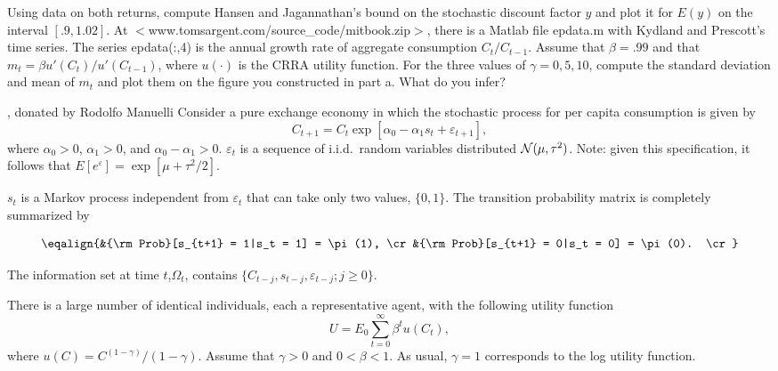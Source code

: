 \medskip


   Using data on both returns,  compute Hansen and Jagannathan's bound
 on the stochastic discount  factor $y$ and plot it
for $E(y)$ on the interval $[.9,1.02]$.
\medskip
{} At
$<$www.tomsargent.com/source\_code/mitbook.zip$>$,
%
 there is
a Matlab file epdata.m with Kydland and Prescott's  time series.
The series epdata(:,4) is the annual growth
rate of aggregate consumption $C_t / C_{t-1}$.
Assume that $\beta=.99$ and that $m_t = \beta u'(C_t)/ u'(C_{t-1})$,
where $u(\cdot)$ is the CRRA utility function.
   For the three values of $\gamma = 0, 5, 10$, compute
the standard deviation and mean of $m_t$ and plot
them on the  figure  you constructed in part a.  What do you
infer?

\medskip
{}
,
donated by Rodolfo Manuelli
\medskip\noindent
Consider a pure exchange economy in which  the stochastic process for per capita  consumption is given by
$$ C_{t+1} = C_t \exp[\alpha_0 - \alpha_1 s_t + \varepsilon_{t+1}],
 $$
where
\medskip
{}  $\alpha_0>0$, $\alpha_1>0$, and $\alpha_0-\alpha_1>0$.
\medskip
{}  ${\varepsilon_t}$ is a sequence of i.i.d.\ random variables
distributed ${\cal N}(\mu, \tau^2)$.  Note: given this specification, it
follows that $E[e^\varepsilon] = \exp[\mu + \tau^2/2]$.
\medskip

  ${s_t}$ is a Markov process independent from
${\varepsilon_t}$ that can take only two values, $\{0,1\}$.  The
transition probability matrix is completely summarized by

$$\eqalign{&{\rm Prob}[s_{t+1} = 1|s_t = 1] = \pi(1),  \cr
           &{\rm Prob}[s_{t+1} = 0|s_t = 0] = \pi(0).  \cr} $$

  The information set at time $t$,$\Omega_t$,
 contains $\{C_{t-j}, s_{t-j}, \varepsilon_{t-j}; j \geq 0\}$.
\medskip

There is a large number of identical individuals, each a representative agent, with the following utility function
$$ U = E_0{\sum_{t=0}^\infty \beta^t u(C_t)}, $$
where $u(C) = C^{(1-\gamma)}/(1-\gamma)$.  Assume that $\gamma>0$
and $0<\beta<1$.
As usual, $\gamma=1$
corresponds to the log utility function.
\medskip

